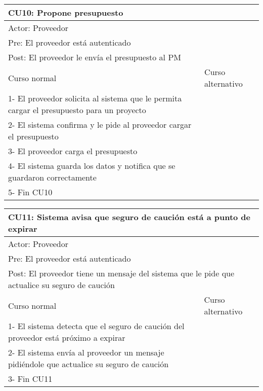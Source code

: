 \begin{table}[H]
  \begin{adjustbox}{max width = \textwidth}
  \begin{tabular}{|l|l|}
    \hline
    \multicolumn{2}{|l|}{CU10: Propone presupuesto} \\\hline
    \multicolumn{2}{|l|}{Actor: Proveedor} \\\hline
    \multicolumn{2}{|l|}{Pre: El proveedor está autenticado} \\\hline
    \multicolumn{2}{|l|}{Post: El proveedor le envía el presupuesto al PM} \\\hline
     Curso normal & Curso alternativo\\ \hline
     1- El proveedor solicita al sistema que le permita cargar el presupuesto para un proyecto & \\ \hline
     2- El sistema confirma y le pide al proveedor cargar el presupuesto & \\ \hline
     3- El proveedor carga el presupuesto &\\ \hline
     4- El sistema guarda los datos y notifica que se guardaron correctamente & \\ \hline
     5- Fin CU10 & \\ \hline
  \end{tabular}
  \end{adjustbox}
\end{table}

\begin{table}[H]
  \begin{adjustbox}{max width = \textwidth}
  \begin{tabular}{|l|l|}
    \hline
    \multicolumn{2}{|l|}{CU11: Sistema avisa que seguro de caución está a punto de expirar} \\\hline
    \multicolumn{2}{|l|}{Actor: Proveedor} \\\hline
    \multicolumn{2}{|l|}{Pre: El proveedor está autenticado} \\\hline
    \multicolumn{2}{|l|}{Post: El proveedor tiene un mensaje del sistema que le pide que actualice su seguro de caución} \\\hline
     Curso normal & Curso alternativo\\ \hline
     1- El sistema detecta que el seguro de caución del proveedor está próximo a expirar & \\ \hline
     2- El sistema envía al proveedor un mensaje pidiéndole que actualice su seguro de caución & \\ \hline
     3- Fin CU11 & \\ \hline
  \end{tabular}
  \end{adjustbox}
\end{table}


